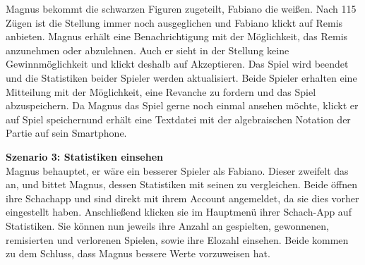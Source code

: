 \documentclass[parskip=full]{scrartcl}
\begin{document}
Magnus bekommt die schwarzen Figuren zugeteilt, Fabiano die weißen. Nach 115 Zügen ist die Stellung immer noch ausgeglichen und Fabiano klickt auf \glqq Remis anbieten\grqq. Magnus erhält eine Benachrichtigung mit der Möglichkeit, das \gls{Remis} anzunehmen oder abzulehnen. Auch er sieht in der Stellung keine Gewinnmöglichkeit und klickt deshalb auf \glqq Akzeptieren\grqq. Das Spiel wird beendet und die Statistiken beider Spieler werden aktualisiert. Beide Spieler erhalten eine Mitteilung mit der Möglichkeit, eine \gls{Revanche} zu fordern und das Spiel abzuspeichern. Da Magnus das Spiel gerne noch einmal ansehen möchte, klickt er auf \glqq Spiel speichern\grqq und erhält eine Textdatei mit der algebraischen \gls{Notation} der Partie auf sein \gls{Smartphone}.

\textbf{Szenario 3: \glqq Statistiken einsehen\grqq} \\
Magnus behauptet, er wäre ein besserer Spieler als Fabiano. Dieser zweifelt das an, und bittet Magnus, dessen Statistiken mit seinen zu vergleichen. Beide öffnen ihre Schachapp und sind direkt mit ihrem Account angemeldet, da sie dies vorher eingestellt haben. Anschließend klicken sie im Hauptmenü ihrer Schach-App auf \glqq Statistiken\grqq. Sie können nun jeweils ihre Anzahl an gespielten, gewonnenen, remisierten und verlorenen Spielen, sowie ihre \gls{Elo}zahl einsehen. Beide kommen zu dem Schluss, dass Magnus bessere Werte vorzuweisen hat.
\pagebreak
\end{document}
